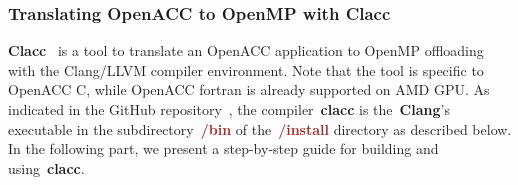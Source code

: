 


\subsubsection{Translating OpenACC to OpenMP with Clacc}


\par
\textbf{Clacc}~\cite{clacc} is a tool to translate an OpenACC application to OpenMP offloading with the Clang/LLVM compiler environment.
Note that the tool is specific to OpenACC C, while OpenACC fortran is already supported on AMD GPU.
As indicated in the GitHub repository~\cite{llvm_project}, the compiler~\textbf{clacc} is the~\textbf{Clang}’s executable in the subdirectory~\textbf{\textcolor{brown}{/bin}} of the~\textbf{\textcolor{brown}{/install}} directory as described below.
In the following part, we present a step-by-step guide for building and using~\textbf{clacc}.


